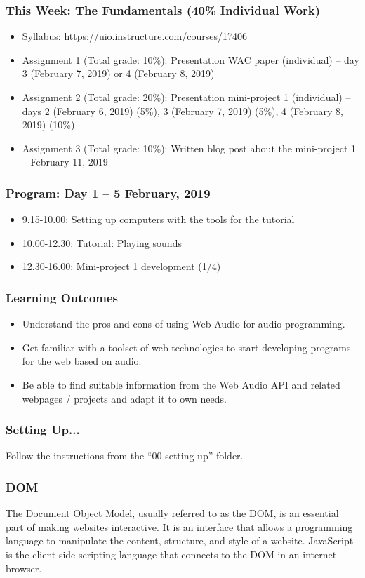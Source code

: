 \documentclass[screen, aspectratio=43]{beamer}
\begin{document}
\begin{frame}
\frametitle{This Week: The Fundamentals (40\% Individual Work)}
\begin{itemize}
\item Syllabus: \url{https://uio.instructure.com/courses/17406}
\item Assignment 1 (Total grade: 10\%): Presentation WAC paper (individual) -- day 3 (February 7, 2019) or 4 (February 8, 2019)
\item Assignment 2 (Total grade: 20\%): Presentation mini-project 1 (individual) -- days 2 (February 6, 2019) (5\%), 3 (February 7, 2019) (5\%), 4 (February 8, 2019) (10\%)
\item Assignment 3 (Total grade: 10\%): Written blog post about the mini-project 1 -- February 11, 2019
\end{itemize}
\end{frame}

\begin{frame}
\frametitle{Program: Day 1 -- 5 February, 2019}
\begin{itemize}
\item 9.15-10.00: Setting up computers with the tools for the tutorial
\item 10.00-12.30: Tutorial: Playing sounds
\item 12.30-16.00: Mini-project 1 development (1/4)
\end{itemize}
\end{frame}

\begin{frame}
\frametitle{Learning Outcomes}
\begin{itemize}
\item Understand the pros and cons of using Web Audio for audio programming.
\item Get familiar with a toolset of web technologies to start developing programs for the web based on audio.
\item Be able to find suitable information from the Web Audio API and related webpages / projects and adapt it to own needs.
\end{itemize}
\end{frame}

\begin{frame}
\frametitle{Setting Up...}
Follow the instructions from the ``00-setting-up'' folder.
\end{frame}

\begin{frame}
\frametitle{DOM}
The Document Object Model, usually referred to as the DOM, is an essential part of making websites interactive. It is an interface that allows a programming language to manipulate the content, structure, and style of a website. JavaScript is the client-side scripting language that connects to the DOM in an internet browser.
\end{frame}
\end{document}
